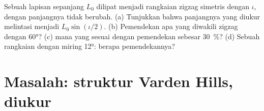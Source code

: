 \begin{exercise}[$\star\star\star$]\label{exo:b1:faults-folds-fabrics:12}
Sebuah lapisan sepanjang $L_0$ dilipat menjadi rangkaian  zigzag simetris dengan  $\iota$, dengan panjangnya tidak berubah. (a) Tunjukkan bahwa panjangnya yang diukur melintasi  menjadi $L_0\sin(\iota/2)$. (b) Pemendekan apa yang diwakili  zigzag dengan  \ang{60}? (c)  mana yang sesuai dengan pemendekan sebesar \qty{30}{\percent}? (d) Sebuah rangkaian  dengan  miring \ang{12}: berapa pemendekannya?
\end{exercise}

\section{Masalah: struktur Varden Hills, diukur}

